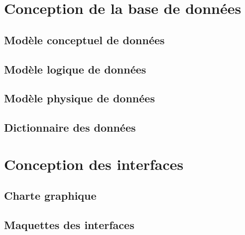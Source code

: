 

\section{Conception de la base de données}


\subsection{Modèle conceptuel de données}


\subsection{Modèle logique de données}


\subsection{Modèle physique de données}


\subsection{Dictionnaire des données}


\section{Conception des interfaces}


\subsection{Charte graphique}


\subsection{Maquettes des interfaces}

